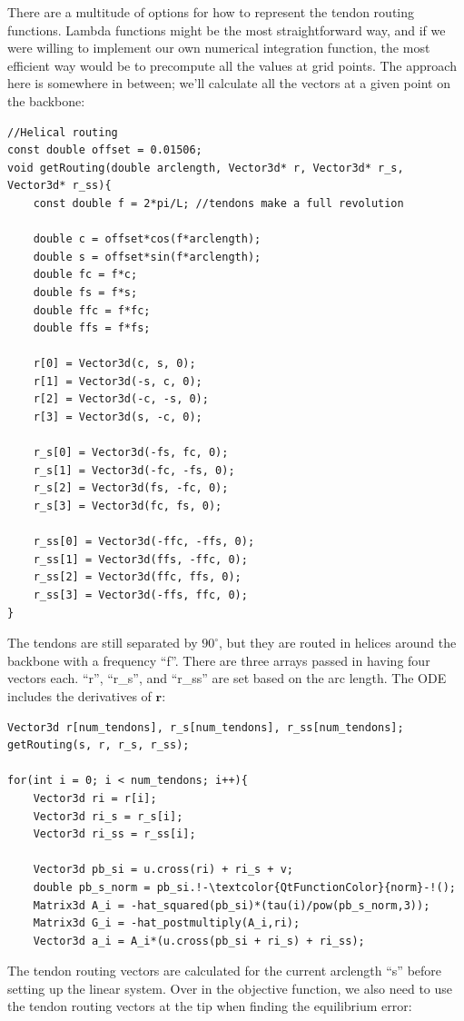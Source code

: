 \documentclass[12pt]{article}
\begin{document}
There are a multitude of options for how to represent the tendon routing functions. Lambda functions might be the most straightforward way, and if we were willing to implement our own numerical integration function, the most efficient way would be to precompute all the values at grid points. The approach here is somewhere in between; we'll calculate all the vectors at a given point on the backbone:
\begin{lstlisting}
//Helical routing
const double offset = 0.01506;
void getRouting(double arclength, Vector3d* r, Vector3d* r_s, Vector3d* r_ss){
    const double f = 2*pi/L; //tendons make a full revolution

    double c = offset*cos(f*arclength);
    double s = offset*sin(f*arclength);
    double fc = f*c;
    double fs = f*s;
    double ffc = f*fc;
    double ffs = f*fs;

    r[0] = Vector3d(c, s, 0);
    r[1] = Vector3d(-s, c, 0);
    r[2] = Vector3d(-c, -s, 0);
    r[3] = Vector3d(s, -c, 0);

    r_s[0] = Vector3d(-fs, fc, 0);
    r_s[1] = Vector3d(-fc, -fs, 0);
    r_s[2] = Vector3d(fs, -fc, 0);
    r_s[3] = Vector3d(fc, fs, 0);

    r_ss[0] = Vector3d(-ffc, -ffs, 0);
    r_ss[1] = Vector3d(ffs, -ffc, 0);
    r_ss[2] = Vector3d(ffc, ffs, 0);
    r_ss[3] = Vector3d(-ffs, ffc, 0);
}
\end{lstlisting}
The tendons are still separated by $90^\circ$, but they are routed in helices around the backbone with a frequency ``f''. There are three arrays passed in having four vectors each. ``r'', ``r\_s'', and ``r\_ss'' are set based on the arc length. The ODE includes the derivatives of $\boldsymbol{r}$:
\begin{lstlisting}
Vector3d r[num_tendons], r_s[num_tendons], r_ss[num_tendons];
getRouting(s, r, r_s, r_ss);

for(int i = 0; i < num_tendons; i++){
    Vector3d ri = r[i];
    Vector3d ri_s = r_s[i];
    Vector3d ri_ss = r_ss[i];

    Vector3d pb_si = u.cross(ri) + ri_s + v;
    double pb_s_norm = pb_si.!-\textcolor{QtFunctionColor}{norm}-!();
    Matrix3d A_i = -hat_squared(pb_si)*(tau(i)/pow(pb_s_norm,3));
    Matrix3d G_i = -hat_postmultiply(A_i,ri);
    Vector3d a_i = A_i*(u.cross(pb_si + ri_s) + ri_ss);
\end{lstlisting}
The tendon routing vectors are calculated for the current arclength ``s'' before setting up the linear system. Over in the objective function, we also need to use the tendon routing vectors at the tip when finding the equilibrium error:
\end{document}
